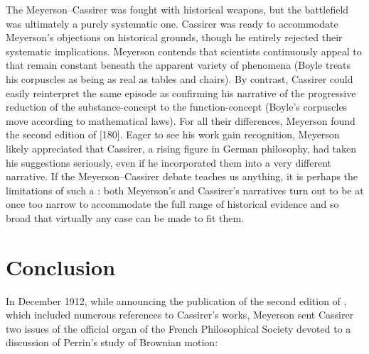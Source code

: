 \documentclass[submitted,12pt]{article}
\newcommand{\IRt}{\bt{Identité et réalité}\xspace}
\begin{document}
The Meyerson--Cassirer  was fought with historical weapons, but the battlefield was ultimately a purely systematic one. Cassirer was ready to accommodate Meyerson’s objections on historical grounds, though he entirely rejected their systematic implications. Meyerson contends that scientists continuously appeal to  that remain constant beneath the apparent variety of phenomena (Boyle treats his corpuscles as being as real as tables and chairs). By contrast, Cassirer could easily reinterpret the same episode as confirming his narrative of the progressive reduction of the substance-concept to the function-concept (Boyle's corpuscles move according to mathematical laws). For all their differences, Meyerson found the second edition of \EPt {} [180]. Eager to see his work gain recognition, Meyerson likely appreciated that Cassirer, a rising figure in German philosophy, had taken his suggestions seriously, even if he incorporated them into a very different narrative. If the Meyerson--Cassirer debate teaches us anything, it is perhaps the limitations of such a : both Meyerson's and Cassirer's narratives turn out to be at once too narrow to accommodate the full range of historical evidence and so broad that virtually any case can be made to fit them.

\section*{Conclusion}
%
In December 1912, while announcing the publication of the second edition of \IRt \citep{Meyerson1912}, which included numerous references to Cassirer’s works, Meyerson sent Cassirer two issues of the official organ of the French Philosophical Society devoted to a discussion of Perrin’s study of Brownian motion:
\end{document}
